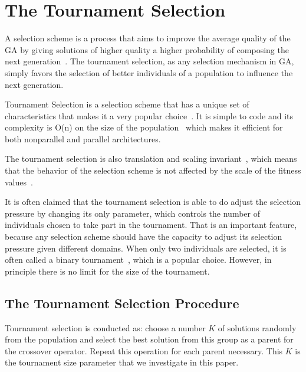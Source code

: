 \section{The Tournament Selection}\label{sec:background:Selection Scheme} 



A selection scheme is a process that aims to improve the average quality of the GA by giving solutions of higher quality a higher probability of composing the next generation~\cite{blickle1995mathematical}.  The tournament selection, as any selection mechanism in GA, simply favors the selection of better individuals of a population to influence the next generation.

Tournament Selection is a selection scheme that has a unique set of characteristics that makes it a very popular choice~\cite{blickle1995mathematical}. It is simple to code and its complexity is O(n) on the size of the population~\cite{goldberg1991comparative} which makes it efficient for both nonparallel and parallel architectures.

 The tournament selection is also translation and scaling invariant~\cite{maza1993analysis}, which means that the behavior of the selection scheme is not affected by the scale of the fitness values~\cite{back2000evolutionary}.


It is often claimed that the tournament selection is able to do adjust the selection pressure by changing its only parameter, which controls the number of individuals chosen to take part in the tournament. That is an important feature, because any selection scheme should have the capacity to adjust its selection pressure given different domains. When only two individuals are selected, it is often called a binary tournament~\cite{blickle1995mathematical, goldberg1991comparative}, which is a popular choice. However, in principle there is no limit for the size of the tournament.

\subsection{The Tournament Selection Procedure}\label{sec:background:tournament_selection} 



Tournament selection is conducted as: choose a number $K$ of solutions randomly from the population and select the best solution from this group as a parent for the crossover operator. Repeat this operation for each parent necessary. This $K$ is the tournament size parameter that we investigate in this paper.





